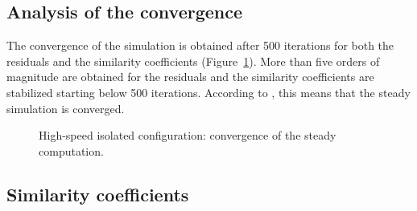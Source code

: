 
\subsection{Analysis of the convergence}
\label{sub:dream_hs_steady_conv}

The convergence of the simulation is obtained 
after 500 iterations for both
the residuals and the similarity coefficients 
(Figure~\ref{fig:dream_HS_convergence_roe2}). More than
five orders of magnitude are obtained for the residuals and
the similarity coefficients are stabilized starting below
500 iterations. According to \citet{Casey2000},
this means that the steady simulation is converged.
\begin{figure}[htp]
  \centering
  \caption{High-speed isolated configuration: convergence of the steady
  computation.}
  \label{fig:dream_HS_convergence_roe2}
\end{figure}

\subsection{Similarity coefficients}
\label{sub:dream_hs_sim_coeff}


